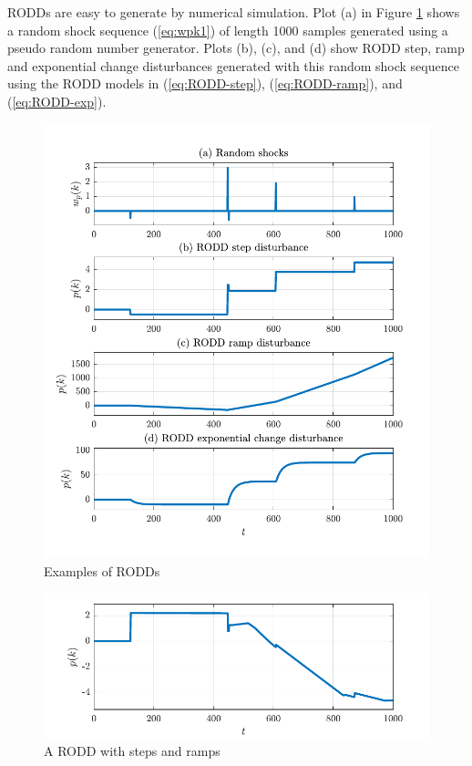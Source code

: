 RODDs are easy to generate by numerical simulation.  Plot (a) in Figure \ref{fig:rodd-sim-plots} shows a random shock sequence (\ref{eq:wpk1}) of length 1000 samples generated using a pseudo random number generator. Plots (b), (c), and (d) show RODD step, ramp and exponential change disturbances generated with this random shock sequence using the RODD models in (\ref{eq:RODD-step}), (\ref{eq:RODD-ramp}), and (\ref{eq:RODD-exp}). 
\begin{figure}[htp]
	\centering
	\includegraphics[width=13cm]{images/rodd_sim_plots.pdf}
	\caption{Examples of RODDs}
	\label{fig:rodd-sim-plots}
\end{figure}
\begin{figure}[htp]
	\centering
	\includegraphics[width=13cm]{images/rodd_sim_plot2.pdf}
	\caption{A RODD with steps and ramps}
	\label{fig:rodd-sim-plot2}
\end{figure}



